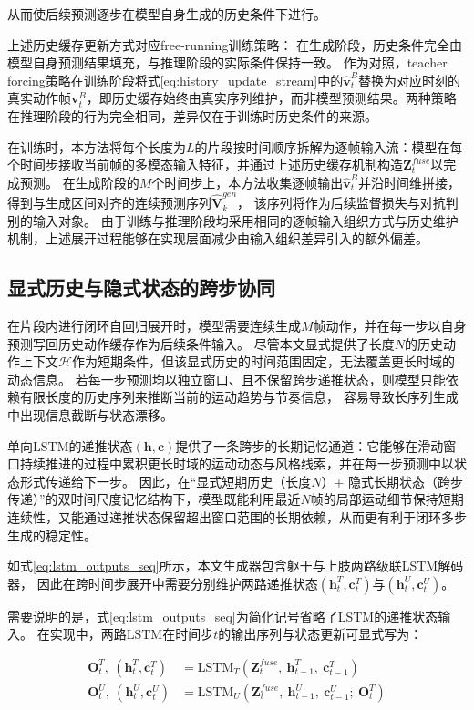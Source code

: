 从而使后续预测逐步在模型自身生成的历史条件下进行。

上述历史缓存更新方式对应free-running训练策略：
在生成阶段，历史条件完全由模型自身预测结果填充，与推理阶段的实际条件保持一致。
作为对照，teacher forcing策略在训练阶段将式\eqref{eq:history_update_stream}中的$\hat{\bm{v}}_{t}^{B}$​替换为对应时刻的真实动作帧$\bm{v}_{t}^{B}$​，即历史缓存始终由真实序列维护，而非模型预测结果。两种策略在推理阶段的行为完全相同，差异仅在于训练时历史条件的来源。

在训练时，本方法将每个长度为$L$的片段按时间顺序拆解为逐帧输入流：模型在每个时间步接收当前帧的多模态输入特征，并通过上述历史缓存机制构造$\bm{Z}_t^{fuse}$以完成预测。
在生成阶段的$M$个时间步上，本方法收集逐帧输出$\hat{\bm{v}}_{t}^{B}$并沿时间维拼接，得到与生成区间对齐的连续预测序列$\hat{\bm{V}}_k^{gen}$，
该序列将作为后续监督损失与对抗判别的输入对象。
由于训练与推理阶段均采用相同的逐帧输入组织方式与历史维护机制，上述展开过程能够在实现层面减少由输入组织差异引入的额外偏差。

\subsection{显式历史与隐式状态的跨步协同}
\label{subsec:state_carry_over}

在片段内进行闭环自回归展开时，模型需要连续生成$M$帧动作，并在每一步以自身预测写回历史动作缓存作为后续条件输入。
尽管本文显式提供了长度$N$的历史动作上下文$\mathcal{H}$作为短期条件，但该显式历史的时间范围固定，无法覆盖更长时域的动态信息。
若每一步预测均以独立窗口、且不保留跨步递推状态，则模型只能依赖有限长度的历史序列来推断当前的运动趋势与节奏信息，
容易导致长序列生成中出现信息截断与状态漂移。

单向LSTM的递推状态$(\bm{h},\bm{c})$提供了一条跨步的长期记忆通道：它能够在滑动窗口持续推进的过程中累积更长时域的运动动态与风格线索，并在每一步预测中以状态形式传递给下一步。
因此，在“显式短期历史（长度$N$）+ 隐式长期状态（跨步传递）”的双时间尺度记忆结构下，模型既能利用最近$N$帧的局部运动细节保持短期连续性，又能通过递推状态保留超出窗口范围的长期依赖，从而更有利于闭环多步生成的稳定性。

如式\eqref{eq:lstm_outputs_seq}所示，本文生成器包含躯干与上肢两路级联LSTM解码器，
因此在跨时间步展开中需要分别维护两路递推状态$(\bm{h}_t^{T},\bm{c}_t^{T})$与$(\bm{h}_t^{U},\bm{c}_t^{U})$。

需要说明的是，式\eqref{eq:lstm_outputs_seq}为简化记号省略了LSTM的递推状态输入。
在实现中，两路LSTM在时间步$t$的输出序列与状态更新可显式写为：

\begin{align}
\bm{O}_t^{T},\ (\bm{h}_t^{T},\bm{c}_t^{T})
&= \mathrm{LSTM}_{T}\!\left(\bm{Z}_t^{fuse},\ \bm{h}_{t-1}^{T},\ \bm{c}_{t-1}^{T}\right)
\label{eq:lstm_state_forward_T}\\
\bm{O}_t^{U},\ (\bm{h}_t^{U},\bm{c}_t^{U})
&= \mathrm{LSTM}_{U}\!\left(\bm{Z}_t^{fuse},\ \bm{h}_{t-1}^{U},\ \bm{c}_{t-1}^{U};\ \bm{O}_t^{T}\right)
\label{eq:lstm_state_forward_U}
\end{align}

